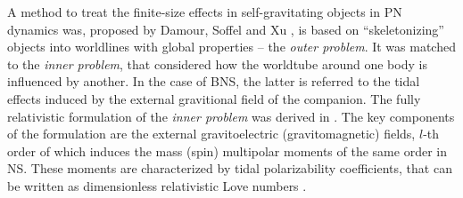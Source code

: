 A method to treat the finite-size effects in self-gravitating objects in \ac{PN} 
dynamics was, proposed by Damour, Soffel and Xu \cite{31}, is based on ``skeletonizing'' 
objects into worldlines with global properties -- the \textit{outer problem}.
%
It was matched to the \textit{inner problem}, that considered how the worldtube 
around one body is influenced by another. In the case of \ac{BNS}, the latter is 
referred to the tidal effects induced by the external gravitional field of the companion. 
The fully relativistic formulation of the \textit{inner problem} was derived in 
\cite{33,32,34}. 
%
%
The key components of the formulation are the external gravitoelectric 
(gravitomagnetic) fields, $l$-th order of which induces the mass (spin) multipolar moments 
of the same order in \ac{NS}. These moments are characterized by %
tidal polarizability coefficients, that can be written as dimensionless relativistic 
Love numbers \cite{32,34}.
%
